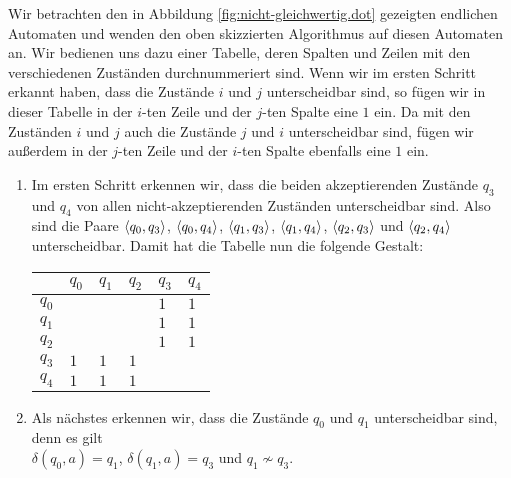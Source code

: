 \vspace*{-0.5cm}
\example
Wir betrachten den in Abbildung \ref{fig:nicht-gleichwertig.dot} gezeigten endlichen
Automaten und wenden den oben skizzierten Algorithmus auf diesen Automaten an.
Wir bedienen uns dazu einer Tabelle, deren Spalten und Zeilen mit den verschiedenen
Zust\"anden durchnummeriert sind.  Wenn wir im ersten Schritt erkannt haben,
dass die Zust\"ande $i$ und $j$ unterscheidbar sind, so f\"ugen wir in dieser Tabelle
 in der $i$-ten Zeile und der $j$-ten Spalte eine $1$ ein.
Da mit den Zust\"anden $i$ und $j$ auch die Zust\"ande $j$ und $i$ unterscheidbar sind,
f\"ugen wir au{\ss}erdem in der $j$-ten Zeile und der $i$-ten Spalte ebenfalls eine $1$ ein.
\begin{enumerate}
\item Im ersten Schritt erkennen wir, dass die beiden akzeptierenden Zust\"ande
      $q_3$ und $q_4$ von allen nicht-akzeptierenden Zust\"anden unterscheidbar sind.
      Also sind die Paare 
      $\pair(q_0,q_3)$,
      $\pair(q_0,q_4)$,
      $\pair(q_1,q_3)$,
      $\pair(q_1,q_4)$,
      $\pair(q_2,q_3)$ und
      $\pair(q_2,q_4)$
      unterscheidbar.  Damit hat die Tabelle nun die folgende Gestalt:
      \begin{center}        
      \begin{tabular}[t]{|l||l|l|l|l|l|}
      \hline
            & $q_0$    &    $q_1$ &    $q_2$ &      $q_3$ &      $q_4$  \\
      \hline
      \hline
      $q_0$ &          &          &          & $1$ & $1$  \\
      \hline
      $q_1$ &          &          &          &$1$ &$1$  \\
      \hline
      $q_2$ &          &          &          &$1$ &$1$  \\
      \hline
      $q_3$ &$1$        &$1$         &       $1$ &          &           \\
      \hline
      $q_4$ &$1$ &$1$ &$1$ &          &           \\
      \hline
      \end{tabular}
      \end{center}
\item Als n\"achstes erkennen wir, dass die Zust\"ande $q_0$ und $q_1$ unterscheidbar sind,
      denn es gilt 
      \\[0.2cm]
      \hspace*{1.3cm}
      $\delta(q_0,a) = q_1$, \quad $\delta(q_1,a) = q_3$ \quad und \quad $q_1 \not\sim q_3$.
      \\[0.2cm]

\end{enumerate}
